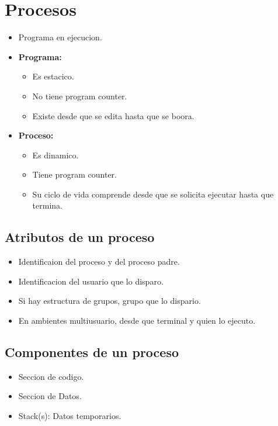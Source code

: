 \pagebreak
\section{Procesos}
\begin{itemize}
    \item Programa en ejecucion.
    \item \textbf{Programa:}
        \begin{itemize}
            \item Es estacico.
            \item No tiene program counter.
            \item Existe desde que se edita hasta que se boora.
        \end{itemize}
    \item \textbf{Proceso:}
        \begin{itemize}
            \item Es dinamico.
            \item Tiene program counter.
            \item Su ciclo de vida comprende desde que se solicita ejecutar hasta que termina.
        \end{itemize}
\end{itemize}

\subsection{Atributos de un proceso}
\begin{itemize}
    \item Identificaion del proceso y del proceso padre.
    \item Identificacion del usuario que lo disparo.
    \item Si hay estructura de grupos, grupo que lo dispario.
    \item En ambientes multiusuario, desde que terminal y quien lo ejecuto.
\end{itemize}

\subsection{Componentes de un proceso}
\begin{itemize}
    \item Seccion de codigo.
    \item Seccion de Datos.
    \item Stack(s): Datos temporarios.
\end{itemize}

